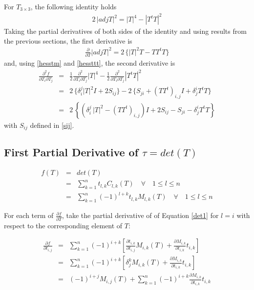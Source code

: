 \documentclass{report}
\begin{document}
\noindent For $T_{3 \times 3}$, the following identity holds
\begin{eqnarray}
2 \, |adj T|^2 = |T|^4 - |T^t T|^2
\end{eqnarray}
Taking the partial derivatives of both sides of the identity and using results 
from the previous sections, the first derivative is
\begin{eqnarray}
\frac{\partial}{\partial T} |adj T|^2 = 2 \, \{ |T|^2 T - T T^t T \}
\end{eqnarray}
and, using \ref{hesstm} and \ref{hessttt}, the second derivative is
\begin{eqnarray}
\frac{\partial^2 f}{\partial T_i \partial T_j} & = & \frac{1}{2} \frac{\partial^2 }{\partial T_i \partial T_j} |T|^4 - \frac{1}{2} \frac{\partial^2}{\partial T_i \partial T_j} |T^t T|^2 \nonumber \\
 & = & 2 \, \{ \delta_i^j |T|^2 I + 2 S_{ij} \} - 2 \, \{ S_{ji} + (T T^t)_{i,j} I + \delta_j^i T^t T \} \nonumber \\
 & = & 2 \, \left\{ \left( \delta_i^j \, |T|^2 - (T T^t)_{i,j} \right) I + 2 S_{ij}-S_{ji} - \delta_j^i T^t T \right\} \label{hess-nrm-adj}
\end{eqnarray}
with $S_{ij}$ defined in \ref{sij}. \newline

\subsection{First Partial Derivative of $\tau=det(T)$}

\begin{eqnarray}
f(T) &=& det(T) \\
     &=& \sum_{k=1}^n t_{l,k} C_{l,k}(T) \quad \forall \quad 1 \le l \le n \\
\label{det1}
     &=& \sum_{k=1}^n (-1)^{l+k} t_{l,k} M_{l,k}(T) \quad \forall \quad 1 \le l \le n
\end{eqnarray}

\noindent For each term of $\frac{\partial f}{\partial T}$, take the partial derivative of of Equation \ref{det1} for $l = i$ with respect to the corresponding element of $T$:

\begin{eqnarray}
\frac{\partial f}{\partial t_{i,j}} &=& 
\sum_{k=1}^n (-1)^{i+k} \left[
 \frac{\partial t_{i,k}}{\partial t_{i,j}} M_{i,k}(T) + 
 \frac{\partial M_{i,k}}{\partial t_{i,k}} t_{i,k} \right] \\
 &=& \sum_{k=1}^n (-1)^{i+k} \left[
 \delta^k_j M_{i,k}(T) + 
 \frac{\partial M_{i,k}}{\partial t_{i,k}} t_{i,k} \right] \\
\label{det2}
 &=& (-1)^{i+j} M_{i,j}(T) + \sum_{k=1}^n (-1)^{i+k} \frac{\partial 
   M_{i,k}}{\partial t_{i,k}} t_{i,k}
\end{eqnarray}
\end{document}
